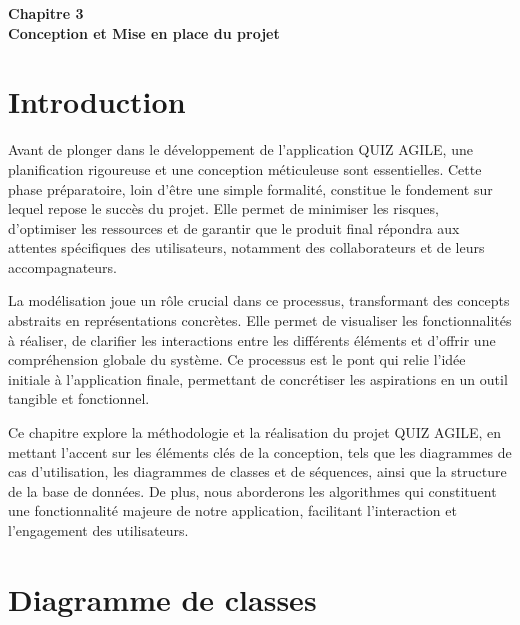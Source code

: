 \documentclass[12pt,a4paper]{report}
\begin{document}

\cleardoublepage
\thispagestyle{empty}
\begin{center}
    \vspace*{4cm}
    {\Huge \textbf{Chapitre 3}}\\[1.5cm]
    {\LARGE \textbf{Conception et Mise en place du projet}}
\end{center}
\cleardoublepage

\setcounter{section}{0}

\section{Introduction}

Avant de plonger dans le développement de l'application QUIZ AGILE, une planification rigoureuse et une conception méticuleuse sont essentielles. Cette phase préparatoire, loin d'être une simple formalité, constitue le fondement sur lequel repose le succès du projet. Elle permet de minimiser les risques, d'optimiser les ressources et de garantir que le produit final répondra aux attentes spécifiques des utilisateurs, notamment des collaborateurs et de leurs accompagnateurs.

La modélisation joue un rôle crucial dans ce processus, transformant des concepts abstraits en représentations concrètes. Elle permet de visualiser les fonctionnalités à réaliser, de clarifier les interactions entre les différents éléments et d'offrir une compréhension globale du système. Ce processus est le pont qui relie l'idée initiale à l'application finale, permettant de concrétiser les aspirations en un outil tangible et fonctionnel.

Ce chapitre explore la méthodologie et la réalisation du projet QUIZ AGILE, en mettant l'accent sur les éléments clés de la conception, tels que les diagrammes de cas d'utilisation, les diagrammes de classes et de séquences, ainsi que la structure de la base de données. De plus, nous aborderons les algorithmes qui constituent une fonctionnalité majeure de notre application, facilitant l'interaction et l'engagement des utilisateurs.

\section{Diagramme de classes}
\end{document}
